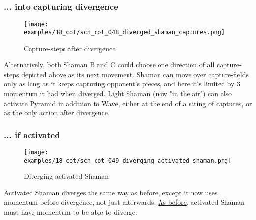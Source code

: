 \subsubsection*{... into capturing divergence}
\label{sec:Conquest of Tlalocan/Divergence/... into capturing divergence}

\vspace*{-1.4\baselineskip}
\noindent
\begin{figure}[!h]
\texttt{[image: examples/18\_cot/scn\_cot\_048\_diverged\_shaman\_captures.png]}
\vspace*{-1.4\baselineskip}
\caption{Capture-steps after divergence}
\label{fig:scn_cot_048_diverged_shaman_captures}
\end{figure}

\vspace*{-0.4\baselineskip}
Alternatively, both Shaman B and C could choose one direction of all capture-steps
depicted above as its next movement. Shaman can move over capture-fields only as
long as it keeps capturing opponent's pieces, and here it's limited by 3 momentum
it had when diverged.\newline
\indent
Light Shaman (now "in the air") can also activate Pyramid in addition to Wave,
either at the end of a string of captures, or as the only action after divergence.

\clearpage %

\subsubsection*{... if activated}
\label{sec:Conquest of Tlalocan/Divergence/... if activated}

\vspace*{-0.7\baselineskip}
\noindent
\begin{wrapfigure}[12]{l}{0.4\textwidth}
\centering
\texttt{[image: examples/18\_cot/scn\_cot\_049\_diverging\_activated\_shaman.png]}
\vspace*{-0.4\baselineskip}
\caption{Diverging activated Shaman}
\label{fig:scn_cot_049_diverging_activated_shaman}
\end{wrapfigure}
Activated Shaman diverges the same way as before, except it now uses momentum before
divergence, not just afterwards.\newline
\indent
\hyperref[fig:scn_cot_032_diverging_activated_piece_init]{As before}, activated
Shaman must have momentum to be able to diverge.

